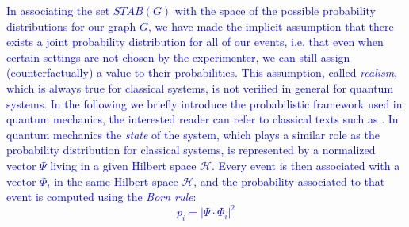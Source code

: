 \documentclass[letterpaper]{article}
\newcommand{\abs}[1]{\left|#1\right|}
\begin{document}
\textcolor{blue}{
In associating the set $STAB(G)$ with the space of the possible probability distributions for our graph $G$,
we have made the implicit assumption that there exists a joint probability distribution for all of our events, 
i.e. that even when certain settings are not chosen by the experimenter, we can still assign (counterfactually) 
a value to their probabilities.
This assumption, called \emph{realism}, which is always true for classical systems, is not verified in general for quantum systems.
In the following we briefly introduce the probabilistic framework used in quantum mechanics, the interested reader can refer to classical 
texts such as \cite{}.
In quantum mechanics the \emph{state} of the system, which plays a similar role as the probability distribution for classical systems,
is represented by a normalized vector $\Psi$ living in a given Hilbert space $\mathcal{H}$.
Every event is then associated with a vector $\Phi_i$ in the same Hilbert space $\mathcal{H}$, and the probability associated to that
event is computed using the \emph{Born rule}:
\begin{equation}
    p_i = \abs{\Psi \cdot \Phi_i}^2 
\end{equation}
}
\end{document}
